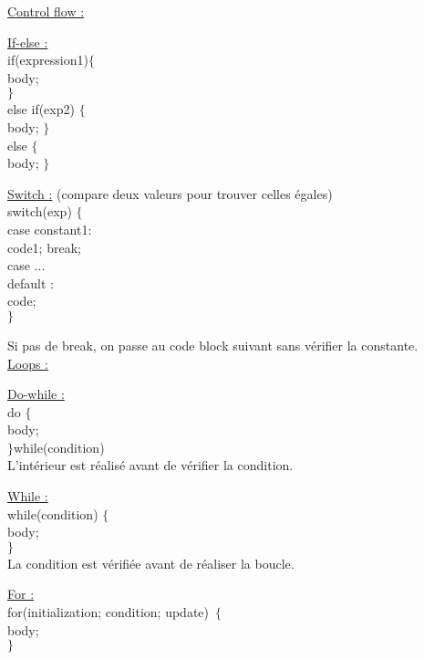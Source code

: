 \documentclass[../main.tex]{subfiles}
\begin{document}
\quad \underline{Control flow :}\\
\begin{minipage}{.5\textwidth}
    \underline{If-else :}\\
    if(expression1)$\{$\\
    body;\\
    $\}$\\
    else if(exp2) $\{$\\
    body;
    $\}$\\
    else $\{$\\
    body;
    $\}$
\end{minipage}
\hfill
\begin{minipage}{.5\textwidth}
    \underline{Switch :} (compare deux valeurs pour trouver celles égales)\\
    switch(exp) $\{$\\
    case constant1:\\
        code1; break;\\
    case ...\\
    default :\\
        code;\\
    $\}$
\end{minipage}
Si pas de break, on passe au code block suivant sans vérifier la constante.\\

\quad \underline{Loops :}\\
\begin{minipage}{.5\textwidth}
    \underline{Do-while :}\\
    do $\{$\\
    body;\\
    $\}$while(condition)\\
    L'intérieur est réalisé avant de vérifier la condition.\\
\end{minipage}
\hfill
\begin{minipage}{.5\textwidth}
    \underline{While :}\\
    while(condition) $\{$\\
    body;\\
    $\}$\\
    La condition est vérifiée avant de réaliser la boucle.\\
\end{minipage}
\underline{For :}\\
for(initialization; condition; update) $\{$\\
body;\\
$\}$\\
\end{document}
